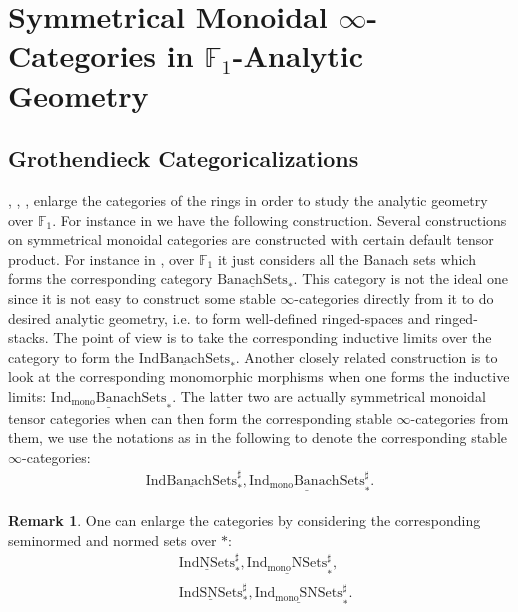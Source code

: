 \documentclass[12pt]{article}
\theoremstyle{definition}
\newtheorem{remark}{Remark}
\begin{document}
\newpage
\section{Symmetrical Monoidal $\infty$-Categories in $\mathbb{F}_1$-Analytic Geometry}

\subsection{Grothendieck Categoricalizations}

\indent \cite{BBBK}, \cite{CS1}, \cite{CS2}, \cite{CS3} enlarge the categories of the rings in order to study the analytic geometry over $\mathbb{F}_1$. For instance in \cite{BBBK} we have the following construction. Several constructions on symmetrical monoidal categories are constructed with certain default tensor product. For instance in \cite{BBBK}, over $\mathbb{F}_1$ it just considers all the Banach sets which forms the corresponding category $\underline{\mathrm{BanachSets}}_*$. This category is not the ideal one since it is not easy to construct some stable $\infty$-categories directly from it to do desired analytic geometry, i.e. to form well-defined ringed-spaces and ringed-stacks. The point of view is to take the corresponding inductive limits over the category to form the $\underline{\mathrm{IndBanachSets}}_*$. Another closely related construction is to look at the corresponding monomorphic morphisms when one forms the inductive limits: $\underline{\mathrm{Ind_{\mathrm{mono}}BanachSets}}_*$. The latter two are actually symmetrical monoidal tensor categories when can then form the corresponding stable $\infty$-categories from them, we use the notations as in the following to denote the corresponding stable $\infty$-categories:
\begin{align}
\underline{\mathrm{IndBanachSets}}^\sharp_*, \underline{\mathrm{Ind_{\mathrm{mono}}BanachSets}}^\sharp_*.
\end{align}

\begin{remark}
One can enlarge the categories by considering the corresponding seminormed and normed sets over $*$:
\begin{align}
&\underline{\mathrm{IndNSets}}^\sharp_*, \underline{\mathrm{Ind_{\mathrm{mono}}NSets}}^\sharp_*,\\
&\underline{\mathrm{IndSNSets}}^\sharp_*, \underline{\mathrm{Ind_{\mathrm{mono}}SNSets}}^\sharp_*.
\end{align}
\end{remark}
\end{document}
